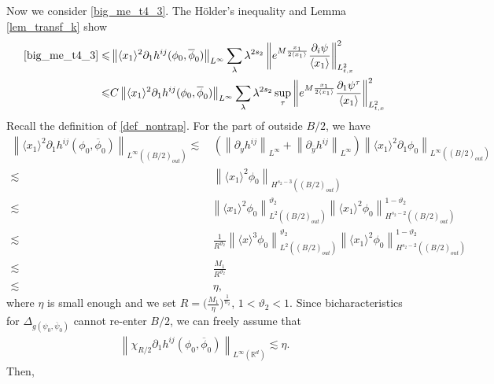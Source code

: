 \documentclass[10pt,twoside,a4paper]{article}
\numberwithin{equation}{section}\allowdisplaybreaks
\def\leq{\leqslant}
\begin{document}
Now we consider \eqref{big_me_t4_3}. The H\"older's inequality and Lemma \ref{lem_transf_k} show
\begin{align*}
	\eqref{big_me_t4_3} \leq &   \left\|\langle x_1\rangle^2  \partial_1 h^{ij} (\phi_0,\overline{\phi}_0)\right\|_{L^\infty} \sum_{\lambda} \lambda^{ 2s_2}\left\|e^{M \frac{x_1}{2\langle x_1\rangle} }  \frac{\partial_i \psi }{\langle x_1\rangle }  \right\|_{L^2_{t,x}}^2\\
	\leq & C\left\|\langle x_1\rangle^2  \partial_1 h^{ij} (\phi_0,\overline{\phi}_0)\right\|_{L^\infty} \sum_{\lambda} \lambda^{ 2s_2} \sup_\tau\left\|e^{M \frac{x_1}{2\langle x_1\rangle} }  \frac{\partial_1 \psi^\tau }{\langle x_1\rangle }  \right\|_{L^2_{t,x}}^2
\end{align*}
Recall the definition of \ref{def_nontrap}. 
For the part of outside  $ B/2 $, we have 
\begin{align*}
	\left\| \langle x_1\rangle^2 \partial_1  h^{ij} (\phi_0,\overline{\phi}_0)\right\|_{L^{\infty}((B/2)_{out})} \lesssim & \, \left( \left\|\partial_y h^{ij}\right\|_{L^\infty}+ \left\|\partial_{\overline{y}} h^{ij}\right\|_{L^\infty}\right) \left\| \langle x_1\rangle^2 \partial_1  \phi_0\right\|_{L^{\infty}((B/2)_{out})} 	\\
 \lesssim&\,\left\| \langle x_1\rangle^2\phi_0\right\|_{H^{s_2-3}((B/2)_{out})}\\
	\lesssim  &\left\| \langle x_1\rangle^2 \phi_0\right\|_{L^{2}((B/2)_{out})}^{\vartheta_2} \left\| \langle x_1\rangle^2 \phi_0\right\|_{H^{s_2-2}((B/2)_{out})}^{1-\vartheta_2}\\
	\lesssim  & \,\frac{1}{R^{ \vartheta_2}}\left\| \langle x \rangle^3\phi_0\right\|_{L^{2}((B/2)_{out})}^{\vartheta_2}  \left\| \langle x_1\rangle^2\phi_0\right\|_{H^{s_2-2}((B/2)_{out})}^{1-\vartheta_2}\\
	\lesssim & \,\frac{M_1}{R^{\vartheta_2}}\\
	\lesssim & \,\eta,
\end{align*}
where $ \eta  $  is small enough and we set $ R= \big(\frac{M_1}{\eta}\big)^{\frac{1}{  \vartheta_2}} $, $ 1<\vartheta_2<1$. Since bicharacteristics for $\Delta_{g\left(\psi_0, \overline{\psi}_0\right)}$  cannot  re-enter $B / 2$, we can freely assume that
\begin{align*}
	\left\| \chi_{R/2}  \partial_1 h^{ij} (\phi_0,\overline{\phi}_0)  \right\|_{L^\infty (\mathbb{R}^d)} \lesssim \eta .
\end{align*}
Then,
\end{document}
